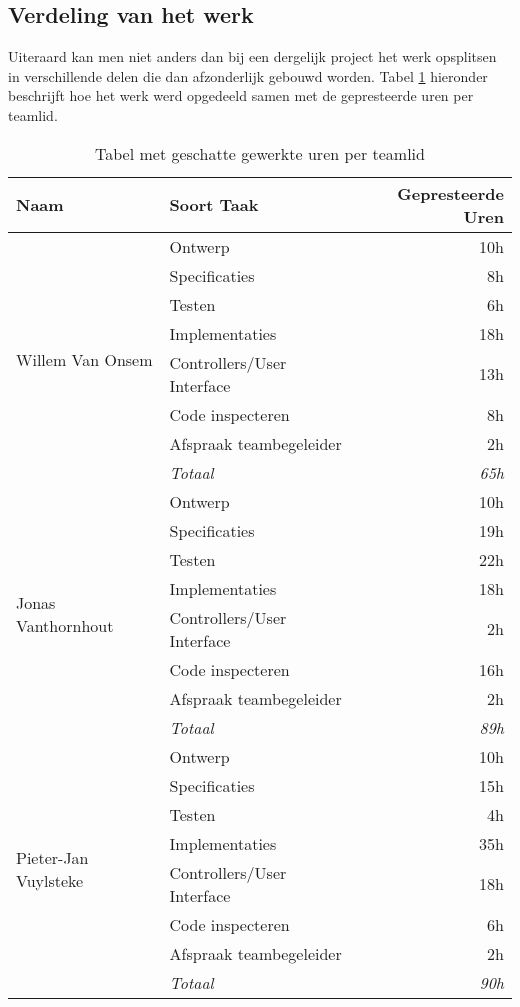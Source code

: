 \subsection{Verdeling van het werk}
Uiteraard kan men niet anders dan bij een dergelijk project het werk opsplitsen in verschillende delen die dan afzonderlijk gebouwd worden. Tabel \ref{tbl:workedHours} hieronder beschrijft hoe het werk werd opgedeeld samen met de gepresteerde uren per teamlid.
\begin{table}[H]
\centering
\begin{tabular}{|l|l|r|}
\hline
\textbf{Naam}&\textbf{Soort Taak}&\textbf{Gepresteerde Uren}\\\hline\hline
\multirow{8}{*}{Willem Van Onsem}&Ontwerp&10h\\
&Specificaties&8h\\
&Testen&6h\\
&Implementaties&18h\\
&Controllers/User Interface&13h\\
&Code inspecteren&8h\\
&Afspraak teambegeleider&2h\\
&\textit{Totaal}&\textit{65h}\\\hline
\multirow{8}{*}{Jonas Vanthornhout}&Ontwerp&10h\\
&Specificaties&19h\\
&Testen&22h\\
&Implementaties&18h\\
&Controllers/User Interface&2h\\
&Code inspecteren&16h\\
&Afspraak teambegeleider&2h\\
&\textit{Totaal}&\textit{89h}\\\hline
\multirow{8}{*}{Pieter-Jan Vuylsteke}&Ontwerp&10h\\
&Specificaties&15h\\
&Testen&4h\\
&Implementaties&35h\\
&Controllers/User Interface&18h\\
&Code inspecteren&6h\\
&Afspraak teambegeleider&2h\\
&\textit{Totaal}&\textit{90h}\\\hline
\end{tabular}
\caption{Tabel met geschatte gewerkte uren per teamlid}
\label{tbl:workedHours}
\end{table}
